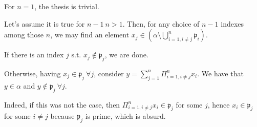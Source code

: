 \documentclass{article}
\newcommand{\pid}{\mathfrak{p}}
\begin{document}
For $n=1$, the thesis is trivial.

Let's assume it is true for $n-1\ n>1$. Then, for any choice of $n-1$ indexes among those $n$, we may find an element $x_j\in(\alpha\setminus\bigcup_{i=1,i\neq j}^n\pid_i)$.

If there is an index $j$ s.t. $x_j\not\in\pid_j$, we are done.

Otherwise, having $x_j\in\pid_j\ \forall j$, consider $y=\sum_{j=1}^n\Pi_{i=1,i\neq j}^n x_i$. We have that $y\in\alpha$ and $y\not\in\pid_j\ \forall j$.

Indeed, if this was not the case, then $\Pi_{i=1,i\neq j}^n x_i\in\pid_j$ for some $j$, hence $x_i\in\pid_j$ for some $i\neq j$ because $\pid_j$ is prime, which is absurd.
\end{document}
